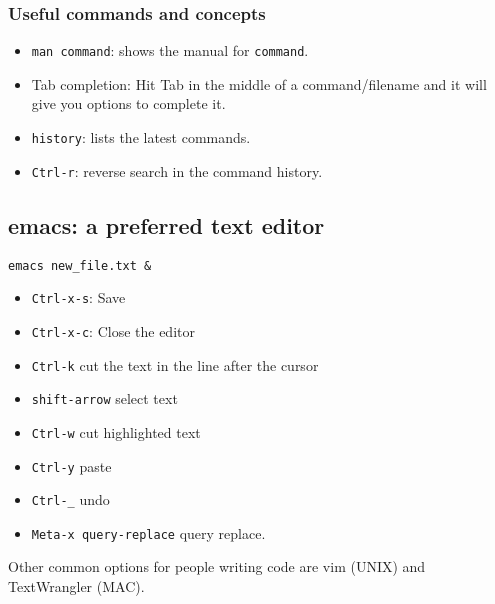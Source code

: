 \documentclass{article}
\begin{document}
\subsubsection*{Useful commands and concepts}
\begin{itemize}
\item\verb"man command": shows the manual for \verb"command".
\item Tab completion: Hit Tab in the middle of a command/filename and it will give you options to complete it.
\item\verb"history": lists the latest commands.
\item\verb"Ctrl-r": reverse search in the command history.
\end{itemize}

\subsection{emacs: a preferred text editor}

\begin{verbatim}
emacs new_file.txt &
\end{verbatim}

\begin{itemize}
\item\verb"Ctrl-x-s": Save
\item\verb"Ctrl-x-c": Close the editor
\item\verb"Ctrl-k" cut the text in the line after the cursor
\item\verb"shift-arrow" select text
\item\verb"Ctrl-w" cut highlighted text
\item\verb"Ctrl-y" paste
\item\verb"Ctrl-_" undo
\item\verb"Meta-x query-replace" query replace.
\end{itemize}

Other common options for people writing code are vim (UNIX) and TextWrangler (MAC). 
\end{document}
